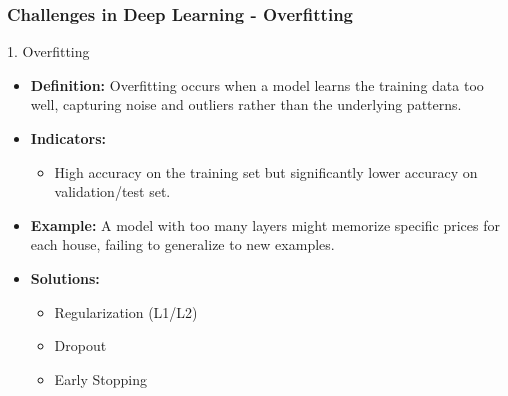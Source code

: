 \documentclass[aspectratio=169]{beamer}
\begin{document}
\begin{frame}[fragile]
    \frametitle{Challenges in Deep Learning - Overfitting}
    \begin{block}{1. Overfitting}
        \begin{itemize}
            \item \textbf{Definition:} Overfitting occurs when a model learns the training data too well, capturing noise and outliers rather than the underlying patterns.
            \item \textbf{Indicators:}
                \begin{itemize}
                    \item High accuracy on the training set but significantly lower accuracy on validation/test set.
                \end{itemize}
            \item \textbf{Example:} A model with too many layers might memorize specific prices for each house, failing to generalize to new examples.
            \item \textbf{Solutions:}
                \begin{itemize}
                    \item Regularization (L1/L2)
                    \item Dropout
                    \item Early Stopping
                \end{itemize}
        \end{itemize}
    \end{block}
\end{frame}
\end{document}
